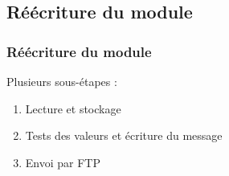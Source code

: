\subsection{Réécriture du module}

\begin{frame}
	\frametitle{Réécriture du module}
	
	Plusieurs sous-étapes :
	\begin{enumerate}
		\item Lecture et stockage
		\item Tests des valeurs et écriture du message
		\item Envoi par FTP\sautligne
	\end{enumerate}
\end{frame}




